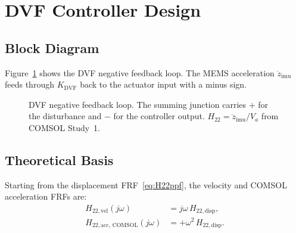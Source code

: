 \documentclass[12pt,a4paper]{article}
\begin{document}
\section{DVF Controller Design}
\label{sec:dvf}

\subsection{Block Diagram}
\label{sec:dvf_block}

Figure~\ref{fig:dvf_block} shows the DVF negative feedback loop.  The
MEMS acceleration $\ddot{z}_\text{imu}$ feeds through $K_\text{DVF}$ back to
the actuator input with a minus sign.

\begin{figure}[h]
\centering
{}
\caption{DVF negative feedback loop.  The summing junction carries $+$ for the
         disturbance and $-$ for the controller output.  $H_{22} = \ddot{z}_\text{imu}/V_a$
         from COMSOL Study~1.}
\label{fig:dvf_block}
\end{figure}

\subsection{Theoretical Basis}
\label{sec:dvf_theory}

Starting from the displacement FRF~\eqref{eq:H22ppf}, the velocity and
COMSOL acceleration FRFs are:
\begin{align}
  H_{22,\text{vel}}(j\omega) &= j\omega\,H_{22,\text{disp}}, \\
  H_{22,\text{acc, COMSOL}}(j\omega) &= +\omega^2\,H_{22,\text{disp}}.
\end{align}
\end{document}
